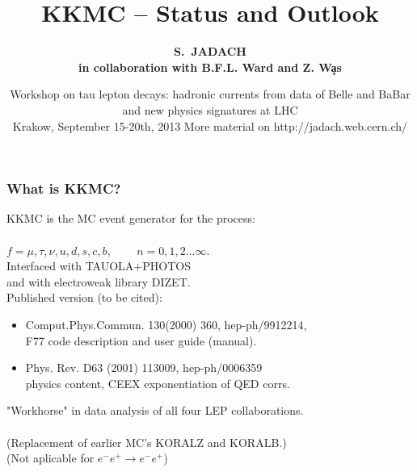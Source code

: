 \documentclass{beamer}
\title[Monte Carlo Methods] %
{ {\bf KKMC -- Status and Outlook}
} %
\author[S.~Jadach] %
{\Large\bf S.~JADACH 
   \\
   \normalsize in collaboration with B.F.L. Ward and Z. W\c{a}s}
\institute[Universities of Somewhere and Elsewhere] %
{ {\large\crd IFJ-PAN, Krak\'ow, Poland}\\
  {~~~}\\
  {\footnotesize
  Partly supported by Polish Government grant\\
  {\em Narodowe Centrum Nauki} DEC-2011/03/B/ST2/02632
}}
\date[Short Occasion] %
{\small Workshop on 
   tau lepton decays: hadronic currents from data of  Belle and BaBar 
   and new physics signatures at LHC\\
   Krakow,
   September 15-20th, 2013
\vskip 4mm
 \footnotesize
  More material on
  http://jadach.web.cern.ch/
}
\newcommand{\cbl}{\color{blue}}
\newcommand{\cmg}{\color{magenta}}
\begin{document}
\begin{frame}
  \titlepage
\end{frame}


\begin{frame}[fragile]
\frametitle{\bf What is KKMC?}
{\large
KKMC is the MC event generator for the process:\\
~~~~~~~~~~~~~~\fbox{\cbl $e^-e^+ \to f\bar{f}+ n\gamma$}\\
{\cbl $f=\mu,\tau,\nu,u,d,s,c,b$,~~~~ $n=0,1,2...\infty$.}
}\\
Interfaced with TAUOLA+PHOTOS\\
and with electroweak library DIZET.\\

Published version \fbox{\cmg 4.13} (to be cited):
\begin{itemize}
\item
Comput.Phys.Commun. 130(2000) 360, hep-ph/9912214,\\
F77 code description and user guide (manual).
\item
Phys. Rev. D63 (2001) 113009, hep-ph/0006359\\
physics content, CEEX exponentiation of QED corrs.\\
\end{itemize}
"Workhorse" in data analysis of all four LEP collaborations.\\
~~~\\
\footnotesize
(Replacement of earlier MC's KORALZ and KORALB.)\\
(Not aplicable for  $e^-e^+ \to e^-e^+$)

\end{frame}
\end{document}
